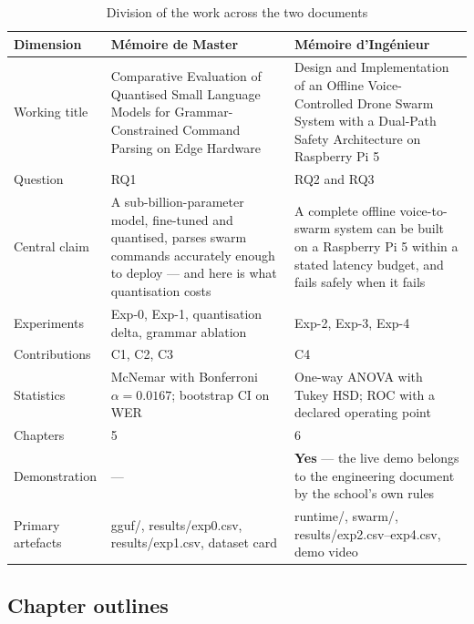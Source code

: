 \documentclass[11pt,a4paper]{article}
\newcommand{\code}[1]{{\ttfamily\small #1}}
\begin{document}
\begin{table}[htbp]
\centering
\caption{Division of the work across the two documents}
\label{tab:theses}
\small
\begin{tabular}{@{}P{0.20}P{0.35}P{0.35}@{}}
\toprule
\textbf{Dimension} & \textbf{M\'emoire de Master} & \textbf{M\'emoire d'Ing\'enieur} \\
\midrule
Working title & Comparative Evaluation of Quantised Small Language Models for Grammar-Constrained
  Command Parsing on Edge Hardware & Design and Implementation of an Offline Voice-Controlled Drone Swarm
  System with a Dual-Path Safety Architecture on Raspberry Pi 5 \\
Question & RQ1 & RQ2 and RQ3 \\
Central claim & A sub-billion-parameter model, fine-tuned and quantised, parses swarm commands accurately
  enough to deploy --- and here is what quantisation costs & A complete offline voice-to-swarm system can
  be built on a Raspberry Pi 5 within a stated latency budget, and fails safely when it fails \\
Experiments & Exp-0, Exp-1, quantisation delta, grammar ablation & Exp-2, Exp-3, Exp-4 \\
Contributions & C1, C2, C3 & C4 \\
Statistics & McNemar with Bonferroni $\alpha = 0.0167$; bootstrap CI on WER & One-way ANOVA with Tukey
  HSD; ROC with a declared operating point \\
Chapters & 5 & 6 \\
Demonstration & --- & \textbf{Yes} --- the live demo belongs to the engineering document by the school's
  own rules \\
Primary artefacts & \code{gguf/}, \code{results/exp0.csv}, \code{results/exp1.csv}, dataset card &
  \code{runtime/}, \code{swarm/}, \code{results/exp2.csv}--\code{exp4.csv}, demo video \\
\bottomrule
\end{tabular}
\end{table}

\subsection{Chapter outlines}
\end{document}
